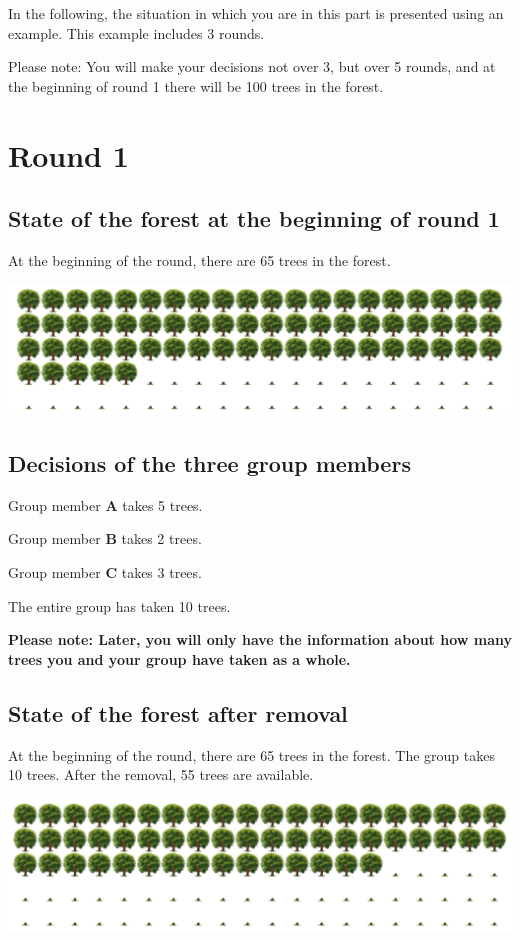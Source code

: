 \setlength{\parskip}{1em}

\noindent In the following, the situation in which you are in this part is presented using an example. This example includes 3 rounds.

\noindent Please note: You will make your decisions not over 3, but over 5 rounds, and at the beginning of round 1 there will be 100 trees in the forest.

\section*{Round 1}
\subsection*{State of the forest at the beginning of round 1}
At the beginning of the round, there are 65 trees in the forest.
\begin{center}
   \includegraphics[width=16cm]{../bld/graphs/A. Round1a.png}
\end{center}

\subsection*{Decisions of the three group members}

\noindent Group member \textbf{A} takes 5 trees.

\noindent Group member \textbf{B} takes 2 trees.

\noindent Group member \textbf{C} takes 3 trees.

\noindent The entire group has taken 10 trees.

\noindent \textbf{Please note: Later, you will only have the information about how many trees you and your group have taken as a whole.}

\subsection*{State of the forest after removal}

At the beginning of the round, there are 65 trees in the forest. The group takes 10 trees. After the removal, 55 trees are available.
\begin{center}
   \includegraphics[width=16cm]{../bld/graphs/A. Round1b.png}
\end{center}

